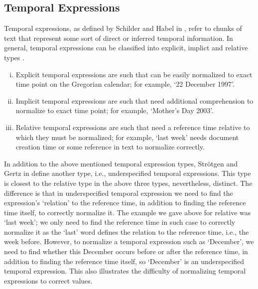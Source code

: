 \subsection{Temporal Expressions} \label{sec_temp_ex}
Temporal expressions, as defined by Schilder and Habel in \cite{DBLP:conf/ndqa/SchilderH03}, refer to chunks of text that represent some sort of direct or inferred temporal information. In general, temporal expressions can be classified into explicit, implict and relative types \cite{DBLP:conf/ndqa/SchilderH03, DBLP:journals/sigir/AlonsoGB07}. 
\begin{enumerate}[i.]
	\item Explicit temporal expressions are such that can be easily normalized to exact time point on the Gregorian calendar; for example, `22 December 1997'.
	\item Implicit temporal expressions are such that need additional comprehension to normalize to exact time point; for example, `Mother's Day 2003'.
	\item Relative temporal expressions are such that need a reference time relative to which they must be normalized; for example, `last week' needs document creation time or some reference in text to normalize correctly.
\end{enumerate}

In addition to the above mentioned temporal expression types, Str{\"{o}}tgen and Gertz in \cite{DBLP:series/synthesis/2016Strotgen} define another type, i.e., underspecified temporal expressions. This type is closest to the relative type in the above three types, nevertheless, distinct. The difference is that in underspecified temporal expression we need to find the expression's `relation' to the reference time, in addition to finding the reference time itself, to correctly normalize it. The example we gave above for relative was `last week'; we only need to find the reference time in such case to correctly normalize it as the `last' word defines the relation to the reference time, i.e., the week before. However, to normalize a temporal expression such as `December', we need to find whether this December occurs before or after the reference time, in addition to finding the reference time itself, so `December' is an underspecified temporal expression. This also illustrates the difficulty of normalizing temporal expressions to correct values. 

